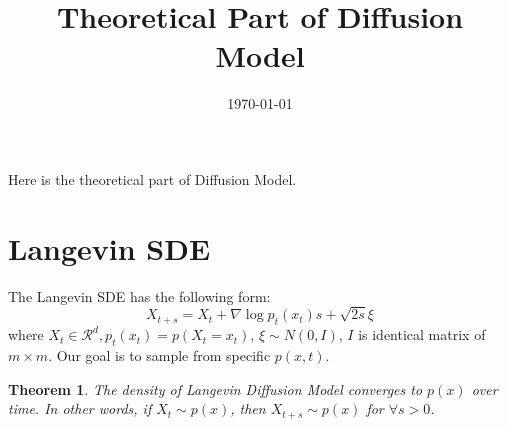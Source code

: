 \documentclass{ctexart}
\title{Theoretical Part of Diffusion Model}
\date{\today}
\newtheorem{theorem}{Theorem}
\begin{document}
Here is the theoretical part of Diffusion Model. 
\section{Langevin SDE}
The Langevin SDE has the following form:
\begin{equation}
    X_{t + s} = X_t + \nabla \log p_t(x_t)s + \sqrt{2s}\xi
\end{equation}
where $X_t\in \mathcal{R}^d, p_t(x_t)=p(X_t=x_t)$, $\xi\sim N(0, I)$, $I$ is identical matrix of $m \times m$. Our goal is to sample from specific $p(x, t)$.

\begin{theorem}
    The density of Langevin Diffusion Model converges to $p(x)$ over time. In other words, if $X_t\sim p(x)$, then $X_{t+s}\sim p(x)$ for $\forall s>0$. 
\end{theorem}
\end{document}
